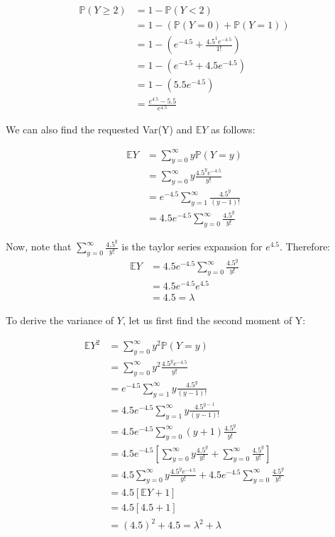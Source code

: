 \documentclass[11pt]{article}
\begin{document}
\begin{enumerate}[label=\textbf{(\alph*)}]
  \[
   \]

  \begin{align*}
  \mathbb{P}(Y \geq 2) &= 1 - \mathbb{P}(Y < 2) \\
  &= 1 - (\mathbb{P}(Y = 0) + \mathbb{P}(Y = 1)) \\
  &= 1 - (e^{-4.5} + \frac{4.5^1 e^{-4.5}}{1!}) \\
  &= 1 - (e^{-4.5} + 4.5e^{-4.5}) \\
  &= 1 - (5.5e^{-4.5}) \\
  &= \frac{e^{4.5} - 5.5}{e^{4.5}}
  \end{align*}


  We can also find the requested Var(Y) and $\mathbb{E}Y$ as follows:

  \begin{align*}
    \mathbb{E}Y &= \sum_{y = 0}^{\infty} y \mathbb{P}(Y = y) \\
    &= \sum_{y = 0}^{\infty} y \frac{4.5^y e^{-4.5}}{y!} \\
    &= e^{-4.5}\sum_{y = 1}^{\infty} \frac{4.5^y}{(y-1)!} \\
    &= 4.5 e^{-4.5}\sum_{y = 0}^{\infty} \frac{4.5^y}{y!}
  \end{align*}

  Now, note that $\sum_{y = 0}^{\infty} \frac{4.5^y}{y!}$ is the taylor series expansion for $e^{4.5}$. Therefore:
  \begin{align*}
    \mathbb{E}Y &= 4.5 e^{-4.5}\sum_{y = 0}^{\infty} \frac{4.5^y}{y!} \\
    &= 4.5 e^{-4.5} e^{4.5} \\
    &= 4.5 = \lambda
  \end{align*}

  To derive the variance of $Y$, let us first find the second moment of Y:


  \begin{align*}
    \mathbb{E}Y^2 &= \sum_{y = 0}^{\infty} y^2 \mathbb{P}(Y = y) \\
    &= \sum_{y = 0}^{\infty} y^2 \frac{4.5^y e^{-4.5}}{y!} \\
    &= e^{-4.5}\sum_{y = 1}^{\infty} y \frac{4.5^y}{(y-1)!} \\
    &= 4.5 e^{-4.5}\sum_{y = 1}^{\infty} y \frac{4.5^{y-1}}{(y-1)!} \\
    &= 4.5 e^{-4.5}\sum_{y = 0}^{\infty} (y+1) \frac{4.5^{y}}{y!} \\
    &= 4.5 e^{-4.5} [\sum_{y = 0}^{\infty} y \frac{4.5^{y}}{y!} + \sum_{y = 0}^{\infty}\frac{4.5^{y}}{y!}] \\
    &= 4.5 \sum_{y = 0}^{\infty} y \frac{4.5^{y}e^{-4.5}}{y!} + 4.5e^{-4.5}\sum_{y = 0}^{\infty}\frac{4.5^{y}}{y!} \\
    &= 4.5[\mathbb{E}Y + 1] \\
    &= 4.5[4.5 + 1] \\
    & = (4.5)^2 + 4.5= \lambda^2 + \lambda
  \end{align*}


\end{enumerate}
\end{document}
